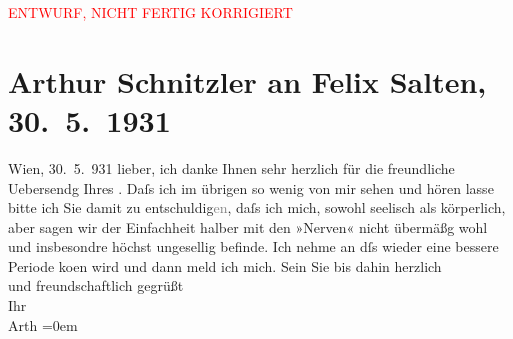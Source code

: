 
\begin{center}
            \textcolor{red}{ENTWURF, NICHT FERTIG KORRIGIERT}
                      \end{center}
            
         
         \renewcommand{\erwaehntePersonen}{Personen: Felix Salten}
         \renewcommand{\erwaehnteOrte}{Orte: Amerika, Wien}
         \renewcommand{\erwaehnteWerke}{Werke: Fünf Minuten Amerika}
               \section[Arthur Schnitzler an Felix Salten, 30. 5. 1931]{ Arthur Schnitzler an Felix Salten, 30. 5. 1931}\nopagebreak{}\rehead{ }\begin{ledgroupsized}[t]{13cm}\normalsize\beginnumbering \toendnotes[C]{\smallbreak\pagebreak[2]} 
\toendnotes[C]{\smallbreak}\pstart
           \raggedleft{}{\pb}Wien, 30. 5. 931\pend
           \pstart
           lieber, ich danke Ihnen sehr herzlich für die freundliche Uebersendg
               Ihres \label{K_L03026-1v}\label{K_L03026-1h}. Daſs ich im übrigen so wenig von mir
               sehen und hören lasse bitte ich Sie damit zu entschuldig\textcolor{gray}{en}, daſs
               ich mich, sowohl seelisch als körperlich, aber sagen wir der Einfachheit halber mit
               den »Nerven« nicht übermäßg wohl und insbesondre höchst ungesellig befinde. Ich nehme
               an dſs wieder {\pb}eine bessere Periode ko{\geminationm}en wird und dann meld ich mich. \pend
           \pstart
           Sein Sie bis dahin herzlich {\\[\baselineskip]}und freundschaftlich gegrüßt {\\[\baselineskip]}Ihr {\\[\baselineskip]}\spacefill\mbox{Arth}\pend
           \leftskip=0em{}
         
         \endnumbering{}\end{ledgroupsized}\begin{anhang}\end{anhang}\newcommand{\dateiname}{L03026}\newcommand{\titel}{Arthur Schnitzler an Felix Salten, 30. 5. 1931}\newcommand{\editorInnen}{Martin Anton Müller und Laura Untner}
      